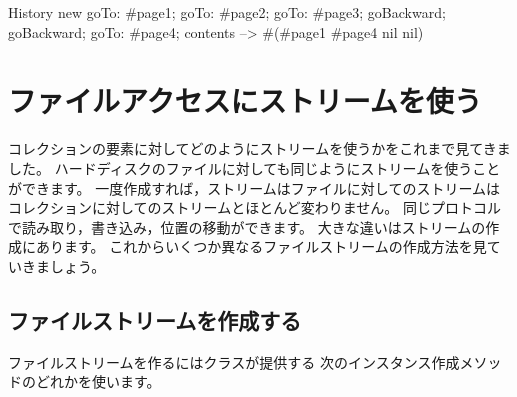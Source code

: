 \documentclass[a4paper,10pt,twoside]{book}
\begin{document}
\begin{code}{}
History new
	goTo: #page1;
	goTo: #page2;
	goTo: #page3;
	goBackward;
	goBackward;
	goTo: #page4;
	contents --> #(#page1 #page4 nil nil)
\end{code}

\section{ファイルアクセスにストリームを使う}

コレクションの要素に対してどのようにストリームを使うかをこれまで見てきました。
ハードディスクのファイルに対しても同じようにストリームを使うことができます。
一度作成すれば，ストリームはファイルに対してのストリームはコレクションに対してのストリームとほとんど変わりません。
同じプロトコルで読み取り，書き込み，位置の移動ができます。
大きな違いはストリームの作成にあります。
これからいくつか異なるファイルストリームの作成方法を見ていきましょう。


\subsection{ファイルストリームを作成する}


ファイルストリームを作るにはクラスが提供する
次のインスタンス作成メソッドのどれかを使います。
\end{document}
